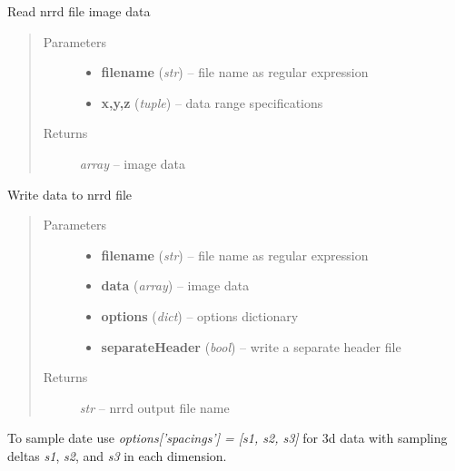 \documentclass[letterpaper,10pt,english]{sphinxmanual}
\begin{document}
\begin{fulllineitems}
\label{api/ClearMap.IO:ClearMap.IO.NRRD.readData}
Read nrrd file image data
\begin{quote}\begin{description}
\item[{Parameters}] \leavevmode\begin{itemize}
\item {} 
\textbf{filename} (\emph{str}) --
file name as regular expression

\item {} 
\textbf{x,y,z} (\emph{tuple}) --
data range specifications

\end{itemize}

\item[{Returns}] \leavevmode
\emph{array} --
image data

\end{description}\end{quote}

\end{fulllineitems}


\begin{fulllineitems}
\label{api/ClearMap.IO:ClearMap.IO.NRRD.writeData}
Write data to nrrd file
\begin{quote}\begin{description}
\item[{Parameters}] \leavevmode\begin{itemize}
\item {} 
\textbf{filename} (\emph{str}) --
file name as regular expression

\item {} 
\textbf{data} (\emph{array}) --
image data

\item {} 
\textbf{options} (\emph{dict}) --
options dictionary

\item {} 
\textbf{separateHeader} (\emph{bool}) --
write a separate header file

\end{itemize}

\item[{Returns}] \leavevmode
\emph{str} --
nrrd output file name

\end{description}\end{quote}

To sample date use \emph{options{[}'spacings'{]} = {[}s1, s2, s3{]}} for
3d data with sampling deltas \emph{s1}, \emph{s2}, and \emph{s3} in each dimension.

\end{fulllineitems}
\end{document}
